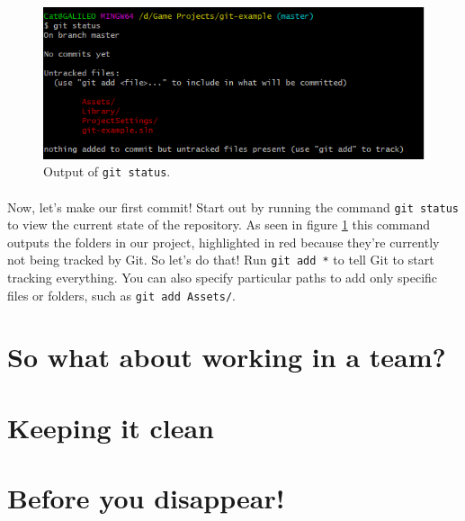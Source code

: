 \documentclass{article}
\begin{document}
\begin{figure}
    \includegraphics[width=\linewidth]{images/status.png}
    \caption{Output of \texttt{git status}.}
    \label{fig:status}
\end{figure}

\paragraph{}
Now, let's make our first commit! Start out by running the command \texttt{git status} to view the current state of the repository. As seen in figure \ref{fig:status} this command outputs the folders in our project, highlighted in red because they're currently not being tracked by Git. So let's do that! Run \texttt{git add *} to tell Git to start tracking everything. You can also specify particular paths to add only specific files or folders, such as \texttt{git add Assets/}.

\section{So what about working in a team?}
\section{Keeping it clean}
\section{Before you disappear!}
\end{document}
